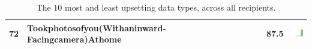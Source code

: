\begin{table}[t]
\begin{center}
\begin{tabular}{| p{0.5cm} | p{7cm} | p{1cm} | c |}
72 & Tookphotosofyou(Withaninward-Facingcamera)Athome & 87.5 & \includegraphics[width = 0.5cm, height = 0.5cm]{../tookphotosofyou(withaninward-facingcamera)athomecombined} \\ 
\hline
\end{tabular}
\caption{The 10 most and least upsetting data types, across all recipients.}
\label{top10}
\end{center}
\end{table}
